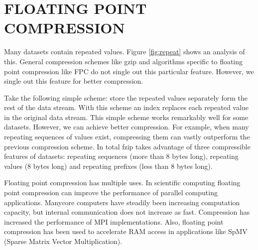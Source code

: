 \chapter{FLOATING POINT COMPRESSION}
\label{chapter:fzip}
\newif\ifshort

\shorttrue

\newif\ifbwtsec

\bwtsecfalse

Many datasets contain repeated values\cite{floatZip:Kourtis,floatZip:Burtscher}. Figure \ref{fig:repeat} shows an analysis of this. General compression schemes like gzip and algorithms specific to floating point compression like FPC do not single out this particular feature. However, we single out this feature for better compression.
\par
Take the following simple scheme: store the repeated values separately form the rest of the data stream. With this scheme an index replaces each repeated value in the original data stream. This simple scheme works remarkably well for some datasets. However, we can achieve better compression. For example, when many repeating sequences of values exist, compressing them can vastly outperform the previous compression scheme. In total fzip takes advantage of three compressible features of datasets: repeating sequences (more than 8 bytes long), repeating values (8 bytes long) and repeating prefixes (less than 8 bytes long).
\par Floating point compression has multiple uses. In scientific computing floating point compression can improve the performance of parallel computing applications. Manycore computers have steadily been increasing computation capacity, but internal communication does not increase as fast. Compression has increased the performance of MPI implementations\cite{floatZip:Ke}. Also, floating point compression has been used to accelerate RAM access in applications like SpMV (Sparse Matrix Vector Multiplication)\cite{floatZip:Kourtis,floatZip:Townsend}.\\
